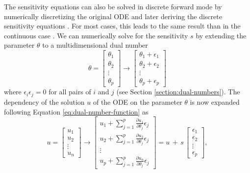 The sensitivity equations can also be solved in discrete forward mode by numerically discretizing the original ODE and later deriving the discrete sensitivity equations \cite{ma2021comparison}. 
For most cases, this leads to the same result than in the continuous case \cite{FATODE2014}.
We can numerically solve for the sensitivity $s$ by extending the parameter $\theta$ to a multidimensional dual number %
\begin{equation}
    \theta =
    \begin{bmatrix}
    \theta_1 \\
    \theta_2 \\
    \vdots \\
    \theta_p
    \end{bmatrix}
    \longrightarrow
    \begin{bmatrix}
    \theta_1 + \epsilon_1 \\
    \theta_2 + \epsilon_2 \\
    \vdots \\
    \theta_p + \epsilon_p
    \end{bmatrix}
\end{equation}
where $\epsilon_i \epsilon_j = 0$ for all pairs of $i$ and $j$ (see Section \ref{section:dual-numbers}). 
The dependency of the solution $u$ of the ODE on the parameter $\theta$ is now expanded following Equation \eqref{eq:dual-number-function} as 
\begin{equation}
    u =
    \begin{bmatrix}
    u_1 \\
    u_2 \\
    \vdots \\
    u_n
    \end{bmatrix}
    \longrightarrow
    \begin{bmatrix}
    u_1 + \sum_{j=1}^p \frac{\partial u_1}{\partial \theta_j} \epsilon_j \\
    u_2 + \sum_{j=1}^p \frac{\partial u_2}{\partial \theta_j} \epsilon_j \\
    \vdots \\
    u_p + \sum_{j=1}^p \frac{\partial u_n}{\partial \theta_j} \epsilon_j
    \end{bmatrix}
    = 
    u \, + \, s \, 
    \begin{bmatrix}
    \epsilon_1 \\
    \epsilon_2 \\
    \vdots \\
    \epsilon_p
    \end{bmatrix},
\end{equation}
